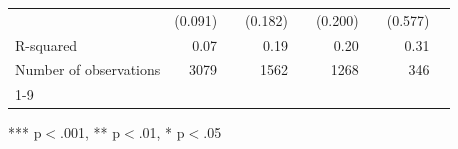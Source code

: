 \documentclass{article}
\begin{document}
\begin{table}[!h]
\begin{tabular}{lllllllll}
\multicolumn{1}{l}{} &
  \multicolumn{1}{r}{(0.091)} &
  \multicolumn{1}{l}{} &
  \multicolumn{1}{r}{(0.182)} &
  \multicolumn{1}{l}{} &
  \multicolumn{1}{r}{(0.200)} &
  \multicolumn{1}{l}{} &
  \multicolumn{1}{r}{(0.577)} &
  \multicolumn{1}{l}{} \\
\multicolumn{1}{l}{R-squared} &
  \multicolumn{1}{r}{0.07} &
  \multicolumn{1}{l}{} &
  \multicolumn{1}{r}{0.19} &
  \multicolumn{1}{l}{} &
  \multicolumn{1}{r}{0.20} &
  \multicolumn{1}{l}{} &
  \multicolumn{1}{r}{0.31} &
  \multicolumn{1}{l}{} \\
\multicolumn{1}{l}{Number of observations} &
  \multicolumn{1}{r}{3079} &
  \multicolumn{1}{l}{} &
  \multicolumn{1}{r}{1562} &
  \multicolumn{1}{l}{} &
  \multicolumn{1}{r}{1268} &
  \multicolumn{1}{l}{} &
  \multicolumn{1}{r}{346} &
  \multicolumn{1}{l}{} \\
\cline{1-9}
\end{tabular}

\footnotesize{
*** p$<$.001, ** p$<$.01, * p$<$.05
}
\end{table}
\end{document}
